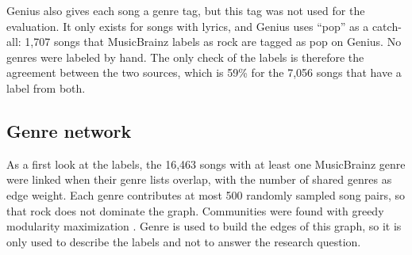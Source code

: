 Genius also gives each song a genre tag, but this tag was not used for the evaluation. It only exists for songs with lyrics, and Genius uses ``pop'' as a catch-all: 1,707 songs that MusicBrainz labels as rock are tagged as pop on Genius. No genres were labeled by hand. The only check of the labels is therefore the agreement between the two sources, which is 59\% for the 7,056 songs that have a label from both.

\subsection*{Genre network}
As a first look at the labels, the 16,463 songs with at least one MusicBrainz genre were linked when their genre lists overlap, with the number of shared genres as edge weight. Each genre contributes at most 500 randomly sampled song pairs, so that rock does not dominate the graph. Communities were found with greedy modularity maximization \cite{TODO_clauset2004greedy}. Genre is used to build the edges of this graph, so it is only used to describe the labels and not to answer the research question.

